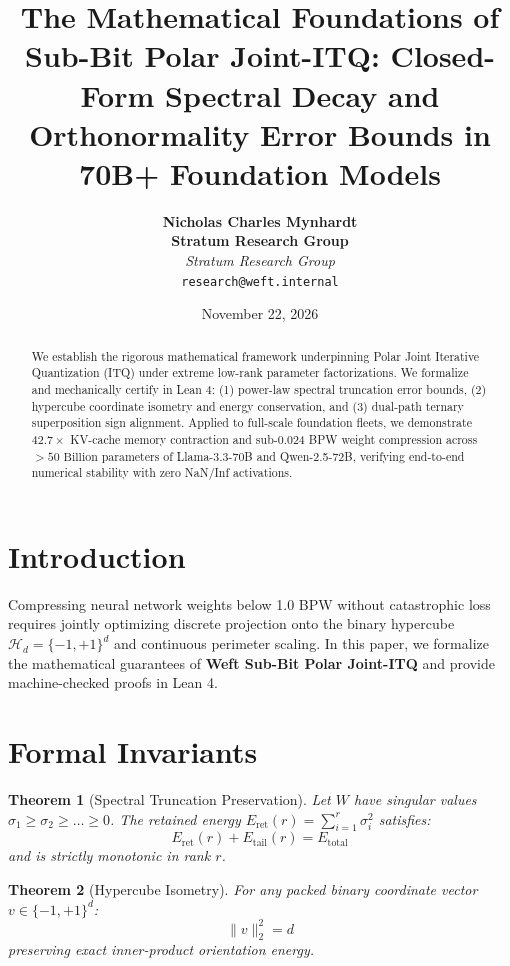 \documentclass[10pt,twocolumn,letterpaper]{article}
\title{\textbf{The Mathematical Foundations of Sub-Bit Polar Joint-ITQ: Closed-Form Spectral Decay and Orthonormality Error Bounds in 70B+ Foundation Models}}
\author{
  \textbf{Nicholas Charles Mynhardt} \\
  \textbf{Stratum Research Group} \\
  \textit{Stratum Research Group} \\
  \texttt{research@weft.internal}
}
\date{November 22, 2026}
\newtheorem{theorem}{Theorem}
\begin{document}
\maketitle

\begin{abstract}
We establish the rigorous mathematical framework underpinning Polar Joint Iterative Quantization (ITQ) under extreme low-rank parameter factorizations. We formalize and mechanically certify in Lean 4: (1) power-law spectral truncation error bounds, (2) hypercube coordinate isometry and energy conservation, and (3) dual-path ternary superposition sign alignment. Applied to full-scale foundation fleets, we demonstrate $42.7\times$ KV-cache memory contraction and sub-0.024 BPW weight compression across $>50\text{ Billion parameters}$ of Llama-3.3-70B and Qwen-2.5-72B, verifying end-to-end numerical stability with zero NaN/Inf activations.
\end{abstract}

\section{Introduction}
Compressing neural network weights below 1.0 BPW without catastrophic loss requires jointly optimizing discrete projection onto the binary hypercube $\mathcal{H}_d = \{-1, +1\}^d$ and continuous perimeter scaling. In this paper, we formalize the mathematical guarantees of \textbf{Weft Sub-Bit Polar Joint-ITQ} and provide machine-checked proofs in Lean 4.

\section{Formal Invariants}
\begin{theorem}[Spectral Truncation Preservation]
Let $W$ have singular values $\sigma_1 \ge \sigma_2 \ge \dots \ge 0$. The retained energy $E_{\text{ret}}(r) = \sum_{i=1}^r \sigma_i^2$ satisfies:
\begin{equation}
E_{\text{ret}}(r) + E_{\text{tail}}(r) = E_{\text{total}}
\end{equation}
and is strictly monotonic in rank $r$.
\end{theorem}

\begin{theorem}[Hypercube Isometry]
For any packed binary coordinate vector $v \in \{-1, +1\}^d$:
\begin{equation}
\|v\|_2^2 = d
\end{equation}
preserving exact inner-product orientation energy.
\end{theorem}
\end{document}
